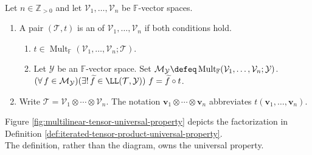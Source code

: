 \begin{definition} \label{def:iterated-tensor-product-universal-property} \\
Let $n\in\mathbb{Z}_{>0}$ and let $\mathcal{V}_1,\ldots,\mathcal{V}_n$ be $\mathbb{F}$-vector spaces.
\begin{enumerate}[label=(\roman*)]
\setlength{\itemsep}{0pt}
\item A pair $(\mathcal{T},t)$ is an  of $\mathcal{V}_1,\ldots,\mathcal{V}_n$ if both conditions hold.
\begin{enumerate}[label=(\alph*)]
\setlength{\itemsep}{0pt}
\item $t\in\operatorname{Mult}_{\mathbb{F}}(\mathcal{V}_1,\ldots,\mathcal{V}_n;\mathcal{T})$.
\item Let $\mathcal{Y}$ be an $\mathbb{F}$-vector space. Set $\mathcal{M}_{\mathcal{Y}}\defeq\operatorname{Mult}_{\mathbb{F}}(\mathcal{V}_1,\ldots,\mathcal{V}_n;\mathcal{Y})$. $(\forall\,f\in\mathcal{M}_{\mathcal{Y}})(\exists!\,\widetilde{f}\in\LL(\mathcal{T},\mathcal{Y}))\ f=\widetilde{f}\circ t$.
\end{enumerate}
\item Write $\mathcal{T}=\mathcal{V}_1\otimes\cdots\otimes\mathcal{V}_n$. The notation $\mathbf{v}_1\otimes\cdots\otimes\mathbf{v}_n$ abbreviates $t(\mathbf{v}_1,\ldots,\mathbf{v}_n)$.
\end{enumerate}
\end{definition}

\begin{illustrationfigure}[H]
  \centering
  
  \caption{The iterated tensor product is universal for multilinear maps.}
  \label{fig:multilinear-tensor-universal-property}
\end{illustrationfigure}

Figure \ref{fig:multilinear-tensor-universal-property} depicts the factorization in Definition \ref{def:iterated-tensor-product-universal-property}.\\
The definition, rather than the diagram, owns the universal property.


